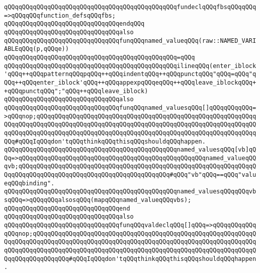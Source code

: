\verb|qQQqqQQqqQQqqQQqqQQqqQQqqQQqqQQqqQQqqQQqqQQqqQQqfundeclqQQqfbsqQQqqQQq=>qQQqqQQqfunction_defsqQQqfbs;|\newline
\verb|qQQqqQQqqQQqqQQqqQQqqQQqqQQqqQQqendqQQq|\newline
\newline
\verb|qQQqqQQqqQQqqQQqqQQqqQQqqQQqqQQqalso|\newline
\verb|qQQqqQQqqQQqqQQqqQQqqQQqqQQqqQQqfunqQQqnamed_valueqQQq(raw::NAMED_VARIABLEqQQq(p,qQQqe))|\newline
\verb|qQQqqQQqqQQqqQQqqQQqqQQqqQQqqQQqqQQqqQQqqQQqqQQq=qQQq|\newline
\verb|qQQqqQQqqQQqqQQqqQQqqQQqqQQqqQQqqQQqqQQqqQQqqQQqilineqQQq(enter_iblock'qQQq++qQQqpatternqQQqpqQQq++qQQqindentqQQq++qQQqpunctqQQq"qQQq=qQQq"qQQq++qQQqenter_iblock'qQQq++qQQqappexpqQQqeqQQq++qQQqleave_iblockqQQq++qQQqpunctqQQq";"qQQq++qQQqleave_iblock)|\newline
\newline
\verb|qQQqqQQqqQQqqQQqqQQqqQQqqQQqqQQqalso|\newline
\verb|qQQqqQQqqQQqqQQqqQQqqQQqqQQqqQQqfunqQQqnamed_valuesqQQq[]qQQqqQQqqQQq=>qQQqnop;qQQqqQQqqQQqqQQqqQQqqQQqqQQqqQQqqQQqqQQqqQQqqQQqqQQqqQQqqQQqqQQqqQQqqQQqqQQqqQQqqQQqqQQqqQQqqQQqqQQqqQQqqQQqqQQqqQQqqQQqqQQqqQQqqQQqqQQqqQQqqQQqqQQqqQQqqQQqqQQqqQQqqQQqqQQqqQQqqQQqqQQqqQQqqQQqqQQqqQQqqQQq#qQQqIqQQqdon'tqQQqthinkqQQqthisqQQqshouldqQQqhappen.|\newline
\verb|qQQqqQQqqQQqqQQqqQQqqQQqqQQqqQQqqQQqqQQqqQQqqQQqnamed_valuesqQQq[vb]qQQq=>qQQqqQQqqQQqqQQqqQQqqQQqqQQqqQQqqQQqqQQqqQQqqQQqqQQqnamed_valueqQQqvb;qQQqqQQqqQQqqQQqqQQqqQQqqQQqqQQqqQQqqQQqqQQqqQQqqQQqqQQqqQQqqQQqqQQqqQQqqQQqqQQqqQQqqQQqqQQqqQQqqQQqqQQqqQQqqQQq#qQQq"vb"qQQq==qQQq"valueqQQqbinding".|\newline
\verb|qQQqqQQqqQQqqQQqqQQqqQQqqQQqqQQqqQQqqQQqqQQqqQQqnamed_valuesqQQqqQQqvbsqQQq=>qQQqqQQqalsosqQQq(mapqQQqnamed_valueqQQqvbs);|\newline
\verb|qQQqqQQqqQQqqQQqqQQqqQQqqQQqqQQqend|\newline
\newline
\verb|qQQqqQQqqQQqqQQqqQQqqQQqqQQqqQQqalso|\newline
\verb|qQQqqQQqqQQqqQQqqQQqqQQqqQQqqQQqfunqQQqvaldeclqQQq[]qQQq=>qQQqqQQqqQQqqQQqnop;qQQqqQQqqQQqqQQqqQQqqQQqqQQqqQQqqQQqqQQqqQQqqQQqqQQqqQQqqQQqqQQqqQQqqQQqqQQqqQQqqQQqqQQqqQQqqQQqqQQqqQQqqQQqqQQqqQQqqQQqqQQqqQQqqQQqqQQqqQQqqQQqqQQqqQQqqQQqqQQqqQQqqQQqqQQqqQQqqQQqqQQqqQQqqQQqqQQqqQQqqQQqqQQqqQQqqQQqqQQq#qQQqIqQQqdon'tqQQqthinkqQQqthisqQQqshouldqQQqhappen.|\newline
